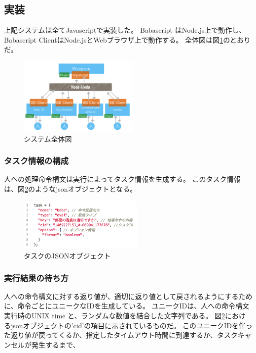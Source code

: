 \subsection{実装}\label{ux5b9fux88c5}

上記システムは全てJavascriptで実装した。 Babascript
はNode.js上で動作し、 Babascript
ClientはNode.jsとWebブラウザ上で動作する。
全体図は図\ref{system}のとおりだ。

\begin{figure}[h]
  \includegraphics[width=220px]{./images/system.png}
  \caption{システム全体図}  
  \label{system}
\end{figure}

\subsubsection{タスク情報の構成}\label{ux30bfux30b9ux30afux60c5ux5831ux306eux69cbux6210}

人への処理命令構文は実行によってタスク情報を生成する。
このタスク情報は、図\ref{task}のようなjsonオブジェクトとなる。

\begin{figure}[h]
  \includegraphics[width=230px]{./images/task.png}
  \caption{タスクのJSONオブジェクト}  
  \label{task}
\end{figure}

\subsubsection{実行結果の待ち方}\label{ux5b9fux884cux7d50ux679cux306eux5f85ux3061ux65b9}

人への命令構文に対する返り値が、適切に返り値として戻されるようにするために、命令ごとにユニークなIDを生成している。
ユニークIDは、人への命令構文実行時のUNIX time
と、ランダムな数値を結合した文字列である。
図\ref{task}におけるjsonオブジェクトの'cid'の項目に示されているものだ。
このユニークIDを伴った返り値が戻ってくるか、指定したタイムアウト時間に到達するか、タスクキャンセルが発生するまで、

